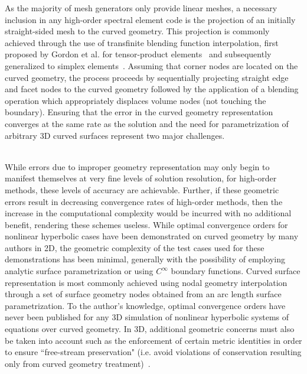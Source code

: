 \documentclass[12pt,Bold,letterpaper,TexShade]{mcgilletdclass}
\numberwithin{equation}{section}
\begin{document}
As the majority of mesh generators only provide linear meshes, a necessary inclusion in any high-order spectral element code is the projection of an initially straight-sided mesh to the curved geometry. This projection is commonly achieved through the use of transfinite blending function interpolation, first proposed by Gordon et al. for tensor-product elements~\cite{gordon1973} and subsequently generalized to simplex elements~\cite{nielson1979,haber1981,szabo1991,lacombe1988,dey1997,xie2013}. Assuming that corner nodes are located on the curved geometry, the process proceeds by sequentially projecting straight edge and facet nodes to the curved geometry followed by the application of a blending operation which appropriately displaces volume nodes (not touching the boundary). Ensuring that the error in the curved geometry representation converges at the same rate as the solution and the need for parametrization of arbitrary 3D curved surfaces represent two major challenges.
\\~

While errors due to improper geometry representation may only begin to manifest themselves at very fine levels of solution resolution, for high-order methods, these levels of accuracy are achievable. Further, if these geometric errors result in decreasing convergence rates of high-order methods, then the increase in the computational complexity would be incurred with no additional benefit, rendering these schemes useless. While optimal convergence orders for nonlinear hyperbolic cases have been demonstrated on curved geometry by many authors in 2D, the geometric complexity of the test cases used for these demonstrations has been minimal, generally with the possibility of employing analytic surface parametrization or using $C^{\infty}$ boundary functions. Curved surface representation is most commonly achieved using nodal geometry interpolation through a set of surface geometry nodes obtained from an arc length surface parametrization. To the author's knowledge, optimal convergence orders have never been published for any 3D simulation of nonlinear hyperbolic systems of equations over curved geometry. In 3D, additional geometric concerns must also be taken into account such as the enforcement of certain metric identities in order to ensure ``free-stream preservation" (i.e. avoid violations of conservation resulting only from curved geometry treatment)~\cite{kopriva2006}.
\\~
\end{document}
